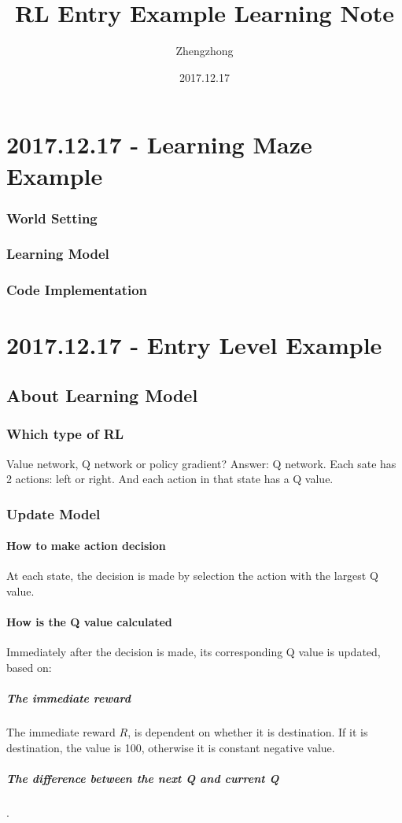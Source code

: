 \documentclass{article}
\title{RL Entry Example Learning Note}
\author{Zhengzhong}
\date{2017.12.17}
\begin{document}
\maketitle

\section{2017.12.17 - Learning Maze Example}
\subsubsection{World Setting}
\subsubsection{Learning Model}
\subsubsection{Code Implementation}




\section{2017.12.17 - Entry Level Example}
\subsection{About Learning Model}
\subsubsection{Which type of RL}
Value network, Q network or policy gradient?
Answer: Q network. Each sate has 2 actions: left or right. And each action in that state has a Q value.
\subsubsection{Update Model}
\paragraph{How to make action decision} At each state, the decision is made by selection the action with the largest Q value.
\paragraph{How is the Q value calculated}
Immediately after the decision is made, its corresponding Q value is updated, based on:
\subparagraph{The immediate reward} The immediate reward $R$, is dependent on whether it is destination. If it is destination, the value is 100, otherwise it is constant negative value.
\subparagraph{The difference between the next Q and current Q}. 
\end{document}
